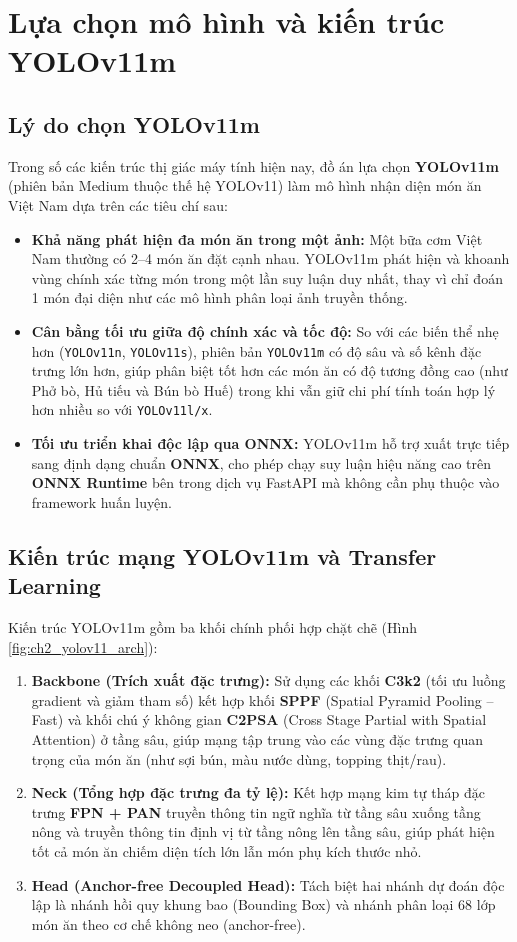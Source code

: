 \documentclass[../main.tex]{subfiles}
\begin{document}
\section{Lựa chọn mô hình và kiến trúc YOLOv11m}
\label{sec:2.3}

\subsection{Lý do chọn YOLOv11m}

Trong số các kiến trúc thị giác máy tính hiện nay, đồ án lựa chọn \textbf{YOLOv11m} (phiên bản Medium thuộc thế hệ YOLOv11) làm mô hình nhận diện món ăn Việt Nam dựa trên các tiêu chí sau:
\begin{itemize}
    \item \textbf{Khả năng phát hiện đa món ăn trong một ảnh:} Một bữa cơm Việt Nam thường có 2--4 món ăn đặt cạnh nhau. YOLOv11m phát hiện và khoanh vùng chính xác từng món trong một lần suy luận duy nhất, thay vì chỉ đoán 1 món đại diện như các mô hình phân loại ảnh truyền thống.
    \item \textbf{Cân bằng tối ưu giữa độ chính xác và tốc độ:} So với các biến thể nhẹ hơn (\texttt{YOLOv11n}, \texttt{YOLOv11s}), phiên bản \texttt{YOLOv11m} có độ sâu và số kênh đặc trưng lớn hơn, giúp phân biệt tốt hơn các món ăn có độ tương đồng cao (như Phở bò, Hủ tiếu và Bún bò Huế) trong khi vẫn giữ chi phí tính toán hợp lý hơn nhiều so với \texttt{YOLOv11l/x}.
    \item \textbf{Tối ưu triển khai độc lập qua ONNX:} YOLOv11m hỗ trợ xuất trực tiếp sang định dạng chuẩn \textbf{ONNX}, cho phép chạy suy luận hiệu năng cao trên \textbf{ONNX Runtime} bên trong dịch vụ FastAPI mà không cần phụ thuộc vào framework huấn luyện.
\end{itemize}

\subsection{Kiến trúc mạng YOLOv11m và Transfer Learning}

Kiến trúc YOLOv11m gồm ba khối chính phối hợp chặt chẽ (Hình \ref{fig:ch2_yolov11_arch}):
\begin{enumerate}
    \item \textbf{Backbone (Trích xuất đặc trưng):} Sử dụng các khối \textbf{C3k2} (tối ưu luồng gradient và giảm tham số) kết hợp khối \textbf{SPPF} (Spatial Pyramid Pooling -- Fast) và khối chú ý không gian \textbf{C2PSA} (Cross Stage Partial with Spatial Attention) ở tầng sâu, giúp mạng tập trung vào các vùng đặc trưng quan trọng của món ăn (như sợi bún, màu nước dùng, topping thịt/rau).
    \item \textbf{Neck (Tổng hợp đặc trưng đa tỷ lệ):} Kết hợp mạng kim tự tháp đặc trưng \textbf{FPN + PAN} truyền thông tin ngữ nghĩa từ tầng sâu xuống tầng nông và truyền thông tin định vị từ tầng nông lên tầng sâu, giúp phát hiện tốt cả món ăn chiếm diện tích lớn lẫn món phụ kích thước nhỏ.
    \item \textbf{Head (Anchor-free Decoupled Head):} Tách biệt hai nhánh dự đoán độc lập là nhánh hồi quy khung bao (Bounding Box) và nhánh phân loại 68 lớp món ăn theo cơ chế không neo (anchor-free).
\end{enumerate}
\end{document}
